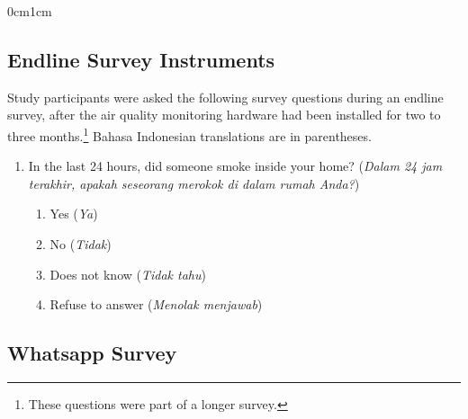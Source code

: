 \documentclass[9pt,twoside,lineno]{pnas-new}
\begin{document}
\begin{adjustwidth}{0cm}{1cm}
\begin{enumerate}
\end{enumerate}


\subsection*{Endline Survey Instruments}

Study participants were asked the following survey questions during an endline survey, after the air quality monitoring hardware had been installed for two to three months.\footnote{These questions were part of a longer survey.} Bahasa Indonesian translations are in parentheses.

\begin{enumerate}
    \item In the last 24 hours, did someone smoke inside your home?	(\textit{Dalam 24 jam terakhir, apakah seseorang merokok di dalam rumah Anda?})
    \begin{enumerate}
        \item Yes (\textit{Ya})
        \item No (\textit{Tidak})
         \item Does not know (\textit{Tidak tahu})
        \item Refuse to answer (\textit{Menolak menjawab})
    \end{enumerate}
    
\end{enumerate}

\subsection*{Whatsapp Survey}


\end{adjustwidth}
\end{document}
